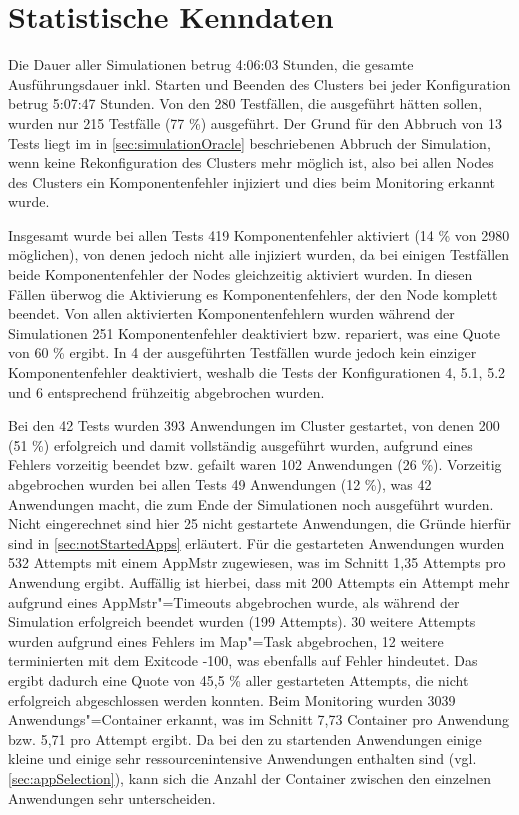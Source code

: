 \section{Statistische Kenndaten}
\label{sec:evaluationStats}

Die Dauer aller Simulationen betrug 4:06:03 Stunden, die gesamte Ausführungsdauer inkl. Starten und Beenden des Clusters bei jeder Konfiguration betrug 5:07:47 Stunden.
Von den 280 Testfällen, die ausgeführt hätten sollen, wurden nur 215 Testfälle (77 \%) ausgeführt.
Der Grund für den Abbruch von 13 Tests liegt im in \autoref{sec:simulationOracle} beschriebenen Abbruch der Simulation, wenn keine Rekonfiguration des Clusters mehr möglich ist, also bei allen Nodes des Clusters ein Komponentenfehler injiziert und dies beim Monitoring erkannt wurde.

Insgesamt wurde bei allen Tests 419 Komponentenfehler aktiviert (14 \% von 2980 möglichen), von denen jedoch nicht alle injiziert wurden, da bei einigen Testfällen beide Komponentenfehler der Nodes gleichzeitig aktiviert wurden.
In diesen Fällen überwog die Aktivierung es Komponentenfehlers, der den Node komplett beendet.
Von allen aktivierten Komponentenfehlern wurden während der Simulationen 251 Komponentenfehler deaktiviert bzw. repariert, was eine Quote von 60 \% ergibt.
In 4 der ausgeführten Testfällen wurde jedoch kein einziger Komponentenfehler deaktiviert, weshalb die Tests der Konfigurationen 4, 5.1, 5.2 und 6 entsprechend frühzeitig abgebrochen wurden.

Bei den 42 Tests wurden 393 Anwendungen im Cluster gestartet, von denen 200 (51 \%) erfolgreich und damit vollständig ausgeführt wurden, aufgrund eines Fehlers vorzeitig beendet bzw. gefailt waren 102 Anwendungen (26 \%).
Vorzeitig abgebrochen wurden bei allen Tests 49 Anwendungen (12 \%), was 42 Anwendungen macht, die zum Ende der Simulationen noch ausgeführt wurden.
Nicht eingerechnet sind hier 25 nicht gestartete Anwendungen, die Gründe hierfür sind in \autoref{sec:notStartedApps} erläutert.
Für die gestarteten Anwendungen wurden 532 Attempts mit einem \ac{AppMstr} zugewiesen, was im Schnitt 1,35 Attempts pro Anwendung ergibt.
Auffällig ist hierbei, dass mit 200 Attempts ein Attempt mehr aufgrund eines \ac{AppMstr}"=Timeouts abgebrochen wurde, als während der Simulation erfolgreich beendet wurden (199 Attempts).
30 weitere Attempts wurden aufgrund eines Fehlers im Map"=Task abgebrochen, 12 weitere terminierten mit dem Exitcode -100, was ebenfalls auf Fehler hindeutet.
Das ergibt dadurch eine Quote von 45,5 \% aller gestarteten Attempts, die nicht erfolgreich abgeschlossen werden konnten.
Beim Monitoring wurden 3039 Anwendungs"=Container erkannt, was im Schnitt 7,73 Container pro Anwendung bzw. 5,71 pro Attempt ergibt.
Da bei den zu startenden Anwendungen einige kleine und einige sehr ressourcenintensive Anwendungen enthalten sind (vgl. \autoref{sec:appSelection}), kann sich die Anzahl der Container zwischen den einzelnen Anwendungen sehr unterscheiden.

